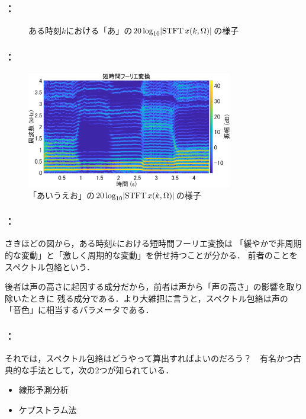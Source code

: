\documentclass[unicode,11pt]{beamer}
\newcommand{\hugefigurewidth}{7cm}
\newcommand{\termdef}[1]{\alert{\sffamily #1}}
\DeclarePairedDelimiter{\abs}{\lvert}{\rvert}
\DeclareMathOperator{\STFT}{STFT}
\begin{document}
\begin{frame}
  \frametitle{\secname ：\subsecname}
  \begin{figure}
    \centering
    \caption{ある時刻\(k\)における「あ」の\(20\log_{10}\abs{\STFT x(k,\Omega)}\)の様子}
    \label{figure:spectre}
  \end{figure}
\end{frame}

\begin{frame}
  \frametitle{\secname ：\subsecname}
  \begin{figure}
    \centering
    \includegraphics[width=9cm]{./figure/spectrogram.pdf}
    \caption{「あいうえお」の\(20\log_{10}\abs{\STFT x(k,\Omega)}\)の様子}
  \end{figure}
\end{frame}

\begin{frame}
  \frametitle{\secname ：\subsecname}
  さきほどの図から，ある時刻\(k\)における短時間フーリエ変換は
  「緩やかで非周期的な変動」と「激しく周期的な変動」を併せ持つことが分かる．
  前者のことを\termdef{スペクトル包絡}という．

  後者は声の高さに起因する成分だから，前者は声から「声の高さ」の影響を取り除いたときに
  残る成分である．より大雑把に言うと，スペクトル包絡は声の「音色」に相当するパラメータである．
\end{frame}

\begin{frame}
  \frametitle{\secname ：\subsecname}
  それでは，スペクトル包絡はどうやって算出すればよいのだろう？　有名かつ古典的な手法として，次の2つが知られている．
  \begin{itemize}
    \item 線形予測分析
    \item ケプストラム法
  \end{itemize}
\end{frame}
\end{document}

